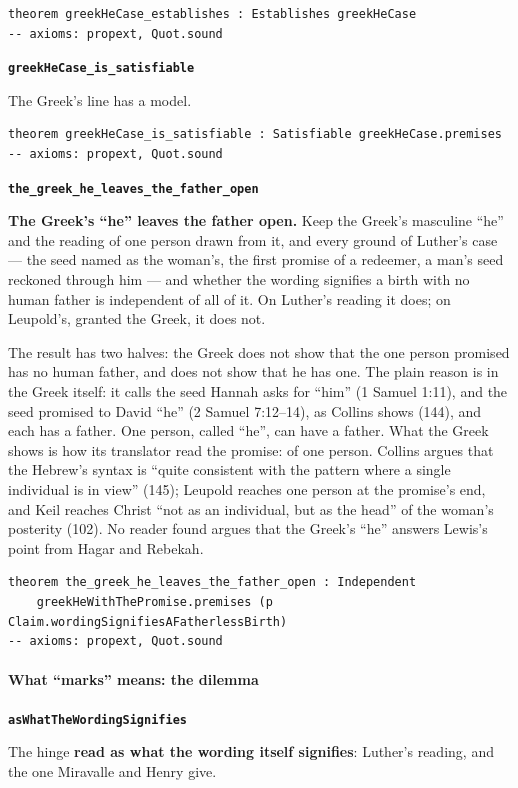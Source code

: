 \documentclass[11pt]{article}
\begin{document}
{\small\begin{verbatim}
theorem greekHeCase_establishes : Establishes greekHeCase
-- axioms: propext, Quot.sound
\end{verbatim}}
\par\medskip\noindent\textbf{\texttt{greek\allowbreak{}He\allowbreak{}Case\_\allowbreak{}is\_\allowbreak{}satisfiable}}\par\nobreak\noindent
The Greek’s line has a model.

{\small\begin{verbatim}
theorem greekHeCase_is_satisfiable : Satisfiable greekHeCase.premises
-- axioms: propext, Quot.sound
\end{verbatim}}
\par\medskip\noindent\textbf{\texttt{the\_\allowbreak{}greek\_\allowbreak{}he\_\allowbreak{}leaves\_\allowbreak{}the\_\allowbreak{}father\_\allowbreak{}open}}\par\nobreak\noindent
\textbf{The Greek’s “he” leaves the father open.} Keep the Greek’s masculine “he” and the reading of one person drawn from it, and every ground of Luther’s case — the seed named as the woman’s, the first promise of a redeemer, a man’s seed reckoned through him — and whether the wording signifies a birth with no human father is independent of all of it. On Luther’s reading it does; on Leupold’s, granted the Greek, it does not.

The result has two halves: the Greek does not show that the one person promised has no human father, and does not show that he has one. The plain reason is in the Greek itself: it calls the seed Hannah asks for “him” (1 Samuel 1:11), and the seed promised to David “he” (2 Samuel 7:12–14), as Collins shows (144), and each has a father. One person, called “he”, can have a father. What the Greek shows is how its translator read the promise: of one person. Collins argues that the Hebrew’s syntax is “quite consistent with the pattern where a single individual is in view” (145); Leupold reaches one person at the promise’s end, and Keil reaches Christ “not as an individual, but as the head” of the woman’s posterity (102). No reader found argues that the Greek’s “he” answers Lewis’s point from Hagar and Rebekah.

{\small\begin{verbatim}
theorem the_greek_he_leaves_the_father_open : Independent
    greekHeWithThePromise.premises (p Claim.wordingSignifiesAFatherlessBirth)
-- axioms: propext, Quot.sound
\end{verbatim}}
\paragraph*{What “marks” means: the dilemma}
\leavevmode\par\nobreak
\par\medskip\noindent\textbf{\texttt{as\allowbreak{}What\allowbreak{}The\allowbreak{}Wording\allowbreak{}Signifies}}\par\nobreak\noindent
The hinge \textbf{read as what the wording itself signifies}: Luther’s reading, and the one Miravalle and Henry give.
\end{document}

